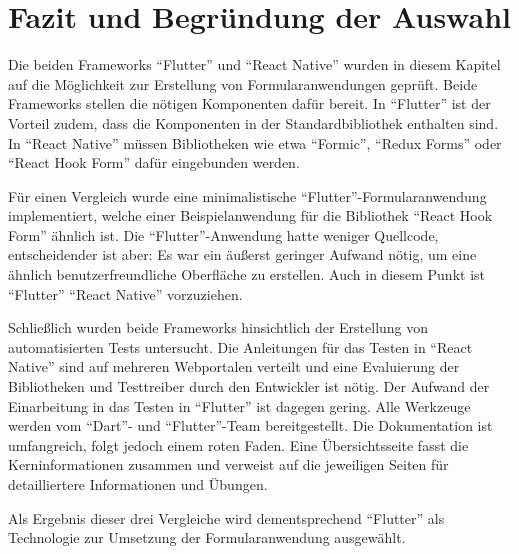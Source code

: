 \clearpage
\section{Fazit und Begründung der Auswahl}
\label{sec:Fazit-und-Begründung-der-Auswahl}



Die beiden Frameworks \enquote{Flutter} und \enquote{React Native} wurden in diesem Kapitel auf die Möglichkeit zur Erstellung von Formularanwendungen geprüft.
Beide Frameworks stellen die nötigen Komponenten dafür bereit.
In \enquote{Flutter} ist der Vorteil zudem, dass die Komponenten in der Standardbibliothek enthalten sind.
In \enquote{React Native} müssen Bibliotheken wie etwa \enquote{Formic}, \enquote{Redux Forms} oder \enquote{React Hook Form} dafür eingebunden werden.

Für einen Vergleich wurde eine minimalistische \enquote{Flutter}-Formularanwendung implementiert,
welche einer Beispielanwendung für die Bibliothek \enquote{React Hook Form} ähnlich ist.
Die \enquote{Flutter}-Anwendung hatte weniger Quellcode,
entscheidender ist aber: Es war ein äußerst geringer Aufwand nötig,
um eine ähnlich benutzerfreundliche Oberfläche zu erstellen.
Auch in diesem Punkt ist \enquote{Flutter} \enquote{React Native} vorzuziehen.

Schließlich wurden beide Frameworks hinsichtlich der Erstellung von automatisierten Tests untersucht.
Die Anleitungen für das Testen in \enquote{React Native} sind auf mehreren Webportalen verteilt und eine Evaluierung der Bibliotheken und Testtreiber durch den Entwickler ist nötig.
Der Aufwand der Einarbeitung in das Testen in \enquote{Flutter} ist dagegen gering.
Alle Werkzeuge werden vom \enquote{Dart}- und \enquote{Flutter}-Team bereitgestellt.
Die Dokumentation ist umfangreich, folgt jedoch einem roten Faden.
Eine Übersichtsseite fasst die Kerninformationen zusammen und verweist auf die jeweiligen  Seiten für detailliertere Informationen und Übungen.


Als Ergebnis dieser drei Vergleiche wird dementsprechend \enquote{Flutter} als Technologie zur Umsetzung der Formularanwendung ausgewählt.
